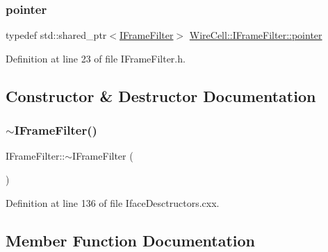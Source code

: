 \subsubsection{\texorpdfstring{pointer}{pointer}}
{\footnotesize\ttfamily typedef std\+::shared\+\_\+ptr$<$\hyperlink{class_wire_cell_1_1_i_frame_filter}{I\+Frame\+Filter}$>$ \hyperlink{class_wire_cell_1_1_i_frame_filter_ada9e2548319a557401707cbc299166f0}{Wire\+Cell\+::\+I\+Frame\+Filter\+::pointer}}



Definition at line 23 of file I\+Frame\+Filter.\+h.



\subsection{Constructor \& Destructor Documentation}
\mbox{\label{class_wire_cell_1_1_i_frame_filter_a5a59a124637dd0cbe7ff6840dbd341f1}} 
\subsubsection{\texorpdfstring{$\sim$\+I\+Frame\+Filter()}{~IFrameFilter()}}
{\footnotesize\ttfamily I\+Frame\+Filter\+::$\sim$\+I\+Frame\+Filter (\begin{DoxyParamCaption}{ }\end{DoxyParamCaption})\hspace{0.3cm}{\ttfamily [virtual]}}



Definition at line 136 of file Iface\+Desctructors.\+cxx.



\subsection{Member Function Documentation}
\mbox{\label{class_wire_cell_1_1_i_frame_filter_ad6ce7c354f616ea9eec2f857165f936d}} 
